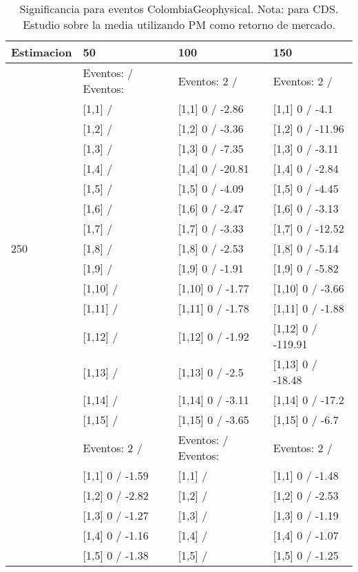 \begin{table}

\caption{Significancia para eventos ColombiaGeophysical. Nota: para CDS. Estudio sobre la media utilizando PM como retorno de mercado.}
\centering
\begin{tabular}[t]{llll}
\toprule
Estimacion & 50 & 100 & 150\\
\midrule
 & Eventos:   / Eventos: & Eventos:  2 / & Eventos:  2 /\\
 & {}[1,1]  / & {}[1,1] 0  / -2.86 & {}[1,1] 0  / -4.1\\
 & {}[1,2]  / & {}[1,2] 0  / -3.36 & {}[1,2] 0  / -11.96\\
 & {}[1,3]  / & {}[1,3] 0  / -7.35 & {}[1,3] 0  / -3.11\\
 & {}[1,4]  / & {}[1,4] 0  / -20.81 & {}[1,4] 0  / -2.84\\
\addlinespace
 & {}[1,5]  / & {}[1,5] 0  / -4.09 & {}[1,5] 0  / -4.45\\
 & {}[1,6]  / & {}[1,6] 0  / -2.47 & {}[1,6] 0  / -3.13\\
 & {}[1,7]  / & {}[1,7] 0  / -3.33 & {}[1,7] 0  / -12.52\\
250 & {}[1,8]  / & {}[1,8] 0  / -2.53 & {}[1,8] 0  / -5.14\\
 & {}[1,9]  / & {}[1,9] 0  / -1.91 & {}[1,9] 0  / -5.82\\
\addlinespace
 & {}[1,10]  / & {}[1,10] 0  / -1.77 & {}[1,10] 0  / -3.66\\
 & {}[1,11]  / & {}[1,11] 0  / -1.78 & {}[1,11] 0  / -1.88\\
 & {}[1,12]  / & {}[1,12] 0  / -1.92 & {}[1,12] 0  / -119.91\\
 & {}[1,13]  / & {}[1,13] 0  / -2.5 & {}[1,13] 0  / -18.48\\
 & {}[1,14]  / & {}[1,14] 0  / -3.11 & {}[1,14] 0  / -17.2\\
\addlinespace
 & {}[1,15]  / & {}[1,15] 0  / -3.65 & {}[1,15] 0  / -6.7\\
 & Eventos:  2 / & Eventos:   / Eventos: & Eventos:  2 /\\
 & {}[1,1] 0  / -1.59 & {}[1,1]  / & {}[1,1] 0  / -1.48\\
 & {}[1,2] 0  / -2.82 & {}[1,2]  / & {}[1,2] 0  / -2.53\\
 & {}[1,3] 0  / -1.27 & {}[1,3]  / & {}[1,3] 0  / -1.19\\
\addlinespace
 & {}[1,4] 0  / -1.16 & {}[1,4]  / & {}[1,4] 0  / -1.07\\
 & {}[1,5] 0  / -1.38 & {}[1,5]  / & {}[1,5] 0  / -1.25\\

\end{tabular}
\end{table}
